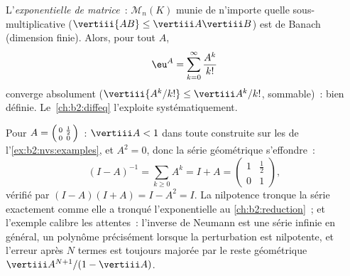 \begin{example}\label{ex:b2:nvs:matrixexp}
L'\emph{exponentielle de matrice}~:
$\mathcal{M}_n(K)$ munie de n'importe quelle  sous-multiplicative
($\vertiii{AB} \leq \vertiii A \vertiii B$) est de Banach (dimension
finie). Alors, pour tout $A$,
\[
\eu^A = \sum_{k=0}^{\infty} \frac{A^k}{k!}
\]
converge absolument ($\vertiii{A^k/k!} \leq \vertiii A^k /k!$,
sommable)~: bien définie. Le~\cref{ch:b2:diffeq} l'exploite
systématiquement.
\end{example}

\begin{example}\label{ex:b2:nvs:neumannfinite}
Pour $A = \begin{psmallmatrix}0 & \frac12\\ 0 &
0\end{psmallmatrix}$~: $\vertiii A < 1$ dans toute 
construite sur les  de l'\cref{ex:b2:nvs:examples}, et $A^2 = 0$,
donc la série géométrique s'effondre~:
\[
(I - A)^{-1} = \sum_{k \geq 0} A^k = I + A =
\begin{pmatrix}1 & \tfrac12\\ 0 & 1\end{pmatrix},
\]
vérifié par $(I - A)(I + A) = I - A^2 = I$. La nilpotence
tronque la série exactement comme elle a tronqué l'exponentielle au
\cref{ch:b2:reduction}~; et l'exemple calibre les attentes~: l'inverse
de Neumann est une série infinie en général, un polynôme précisément
lorsque la perturbation est nilpotente, et l'erreur après $N$ termes
est toujours majorée par le reste géométrique $\vertiii A^{N+1}/(1 -
\vertiii A)$.
\end{example}

